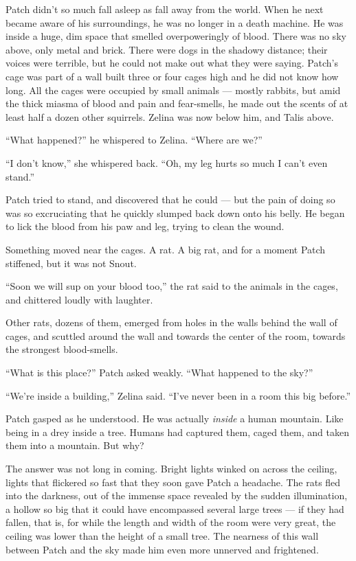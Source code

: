 \documentclass[ebook,oneside,openany,17pt]{memoir}
\newenvironment{tolerant}[1]{%
  \par\tolerance=#1\relax
}{%
  \par
}
\begin{document}
Patch didn’t so much fall asleep as fall away from the world. When he
next became aware of his surroundings, he was no longer in a death
machine. He was inside a huge, dim space that smelled overpoweringly
of blood. There was no sky above, only metal and brick. There were
dogs in the shadowy distance; their voices were terrible, but he could
not make out what they were saying. Patch’s cage was part of a wall
built three or four cages high and he did not know how long. All the
cages were occupied by small animals — mostly rabbits, but amid the
thick miasma of blood and pain and fear-smells, he made out the scents
of at least half a dozen other squirrels. Zelina was now below him,
and Talis above.

\begin{tolerant}{10000}
“What happened?” he whispered to Zelina. “Where are we?”
\end{tolerant}

“I don’t know,” she whispered back. “Oh, my leg hurts so much I can’t
even stand.”

Patch tried to stand, and discovered that he could — but the pain of
doing so was so excruciating that he quickly slumped back down onto
his belly. He began to lick the blood from his paw and leg, trying to
clean the wound.

Something moved near the cages. A rat. A big rat, and for a moment
Patch stiffened, but it was not Snout.

“Soon we will sup on your blood too,” the rat said to the animals in
the cages, and chittered loudly with laughter.

Other rats, dozens of them, emerged from holes in the walls behind the
wall of cages, and scuttled around the wall and towards the center of
the room, towards the strongest blood-smells.

“What is this place?” Patch asked weakly. “What happened to the sky?”

“We’re inside a building,” Zelina said. “I’ve never been in a room
this big before.”

Patch gasped as he understood. He was actually \emph{inside} a human
mountain. Like being in a drey inside a tree. Humans had captured
them, caged them, and taken them into a mountain. But why?

The answer was not long in coming. Bright lights winked on across the
ceiling, lights that flickered so fast that they soon gave Patch a
headache. The rats fled into the darkness, out of the immense space
revealed by the sudden illumination, a hollow so big that it could
have encompassed several large trees — if they had fallen, that is,
for while the length and width of the room were very great, the
ceiling was lower than the height of a small tree. The nearness of
this wall between Patch and the sky made him even more unnerved and
frightened.
\end{document}
